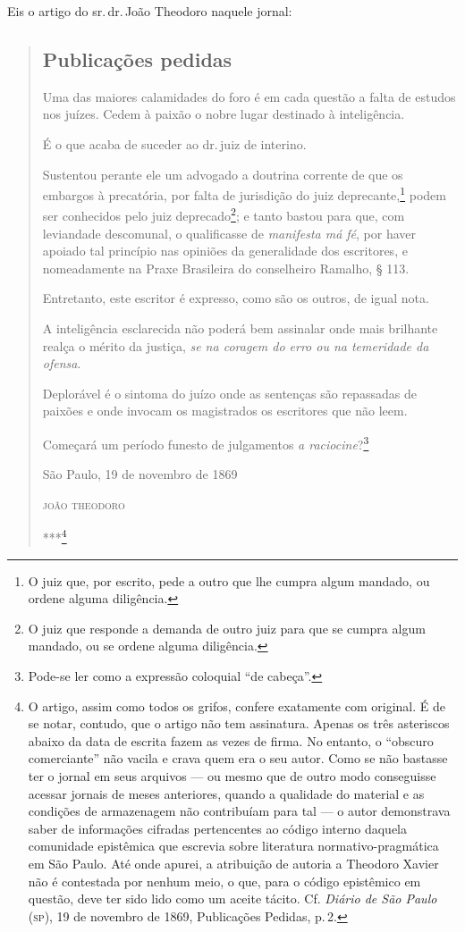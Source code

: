 Eis o artigo do sr.\,dr.\,João Theodoro naquele jornal:

\begin{quote}
\subsection{Publicações pedidas}

Uma das maiores calamidades do foro é em cada questão a falta de
estudos nos juízes. Cedem à paixão o nobre lugar destinado à
inteligência.

É o que acaba de suceder ao dr.\,juiz de interino.

Sustentou perante ele um advogado a doutrina corrente de que os embargos
à precatória, por falta de jurisdição do juiz deprecante,\footnote{ O
  juiz que, por escrito, pede a outro que lhe cumpra algum mandado, ou
  ordene alguma diligência.} podem ser conhecidos pelo juiz
deprecado\footnote{ O juiz que responde a demanda de outro juiz para
  que se cumpra algum mandado, ou se ordene alguma diligência.}; e tanto
bastou para que, com leviandade descomunal, o qualificasse de
\emph{manifesta má fé}, por haver apoiado tal princípio nas opiniões da
generalidade dos escritores, e nomeadamente na Praxe Brasileira do
conselheiro Ramalho, § 113.

Entretanto, este escritor é expresso, como são os outros, de igual nota.

A inteligência esclarecida não poderá bem assinalar onde mais brilhante
realça o mérito da justiça, \emph{se na coragem do erro ou na temeridade
da ofensa}.

Deplorável é o sintoma do juízo onde as sentenças são repassadas de
paixões e onde invocam os magistrados os escritores que não leem.

Começará um período funesto de julgamentos \emph{a
raciocine}?\footnote{ Pode-se ler como a expressão coloquial ``de cabeça''.}

\begin{flushright}
São Paulo, 19 de novembro de 1869

\textsc{joão theodoro}

***\footnote{ O artigo, assim como todos os grifos, confere exatamente
  com original. É de se notar, contudo, que o artigo não tem assinatura.
  Apenas os três asteriscos abaixo da data de escrita fazem as vezes de
  firma. No entanto, o ``obscuro comerciante'' não vacila e crava quem era
  o seu autor. Como se não bastasse ter o jornal em seus arquivos --- ou
  mesmo que de outro modo conseguisse acessar jornais de meses
  anteriores, quando a qualidade do material e as condições de
  armazenagem não contribuíam para tal --- o autor demonstrava saber de
  informações cifradas pertencentes ao código interno daquela comunidade
  epistêmica que escrevia sobre literatura normativo-pragmática em São
  Paulo. Até onde apurei, a atribuição de autoria a Theodoro Xavier não
  é contestada por nenhum meio, o que, para o código epistêmico em
  questão, deve ter sido lido como um aceite tácito. Cf. \emph{Diário de
  São Paulo} (\textsc{sp}), 19 de novembro de 1869, Publicações Pedidas, p.\,2.}
\end{flushright}
\end{quote}


